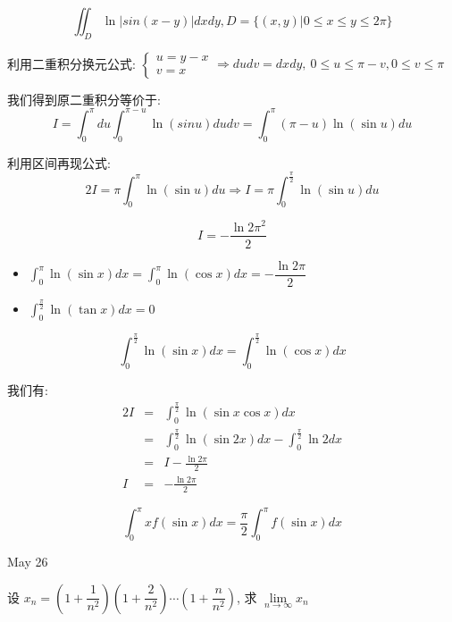 \begin{example}[][Exam: 31.4.8]
	$$\iint_{D}\ln|sin(x-y)|dxdy, D=\{(x,y)|0\leq x\leq y\leq 2\pi\}$$
\end{example}

\begin{solution}
	
	利用二重积分换元公式: $\left\lbrace 
	\begin{array}{l}
		u=y-x\\
		v=x
	\end{array}
	\right.\Rightarrow dudv=dxdy,\ 0\leq u\leq \pi-v,0\leq v\leq \pi$
	
	我们得到原二重积分等价于: 
	$$I=\int_{0}^{\pi}du\int_{0}^{\pi-u}\ln(sin u)dudv=\int_{0}^{\pi}(\pi-u)\ln(\sin u)du$$
	
	利用区间再现公式: 
	$$2I=\pi\int_{0}^{\pi}\ln(\sin u)du\Rightarrow I=\pi\int_{0}^{\frac{\pi}{2}}\ln(\sin u)du$$
	
	$$I=-\frac{\ln 2\pi^2}{2}$$
	\begin{lemma}[区间再现例子]
		\begin{itemize}
			\item $\int_{0}^{\pi}\ln(\sin x)dx=\int_{0}^{\pi}\ln(\cos x)dx=-\dfrac{\ln 2\pi}{2}$
			\item $\int_{0}^{\frac{\pi}{2}}\ln(\tan x)dx=0$
		\end{itemize}
		\begin{anymark}[注]
			$$\int_{0}^{\frac{\pi}{2}}\ln(\sin x)dx=\int_{0}^{\frac{\pi}{2}}\ln(\cos x)dx$$
			
			我们有: 
			\begin{eqnarray*}
				2I&=&\int_{0}^{\frac{\pi}{2}}\ln(\sin x\cos x)dx\\
				&=&\int_{0}^{\frac{\pi}{2}}\ln(\sin 2x)dx-\int_{0}^{\frac{\pi}{2}}\ln 2dx\\
				&=&I-\frac{\ln 2\pi}{2}\\
				I&=&-\frac{\ln 2\pi}{2}
			\end{eqnarray*}
		\end{anymark}
		$$\int_{0}^{\pi}xf(\sin x)dx=\frac{\pi}{2}\int_{0}^{\pi}f(\sin x)dx$$
	\end{lemma}
\end{solution}


\textcolor{purplea}{May 26}

\begin{example}[][Exam: 31.4.9]
	设 $x_{n}=(1+\dfrac{1}{n^2})(1+\dfrac{2}{n^2})\cdots(1+\dfrac{n}{n^2})$, 求 $\lim\limits_{n\to\infty}x_{n}$
\end{example}

